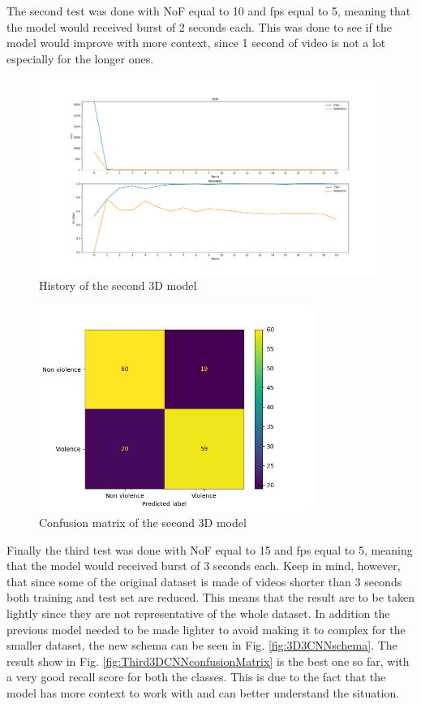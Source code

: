The second test was done with NoF equal to 10 and fps equal to 5, meaning that the model would received burst of 2 seconds each. This was done to see if the model would improve with more context, since 1 second of video is not a lot especially for the longer ones. 
\begin{figure}[]
    \centering
    \includegraphics[width=\textwidth]{images/ce07-testGiacomo3D3-9fcf-history.png}
    \caption{History of the second 3D model}
    \label{fig:Second3DCNNHistory}
\end{figure}


\begin{figure}[]
    \centering
    \includegraphics[width=0.8\textwidth]{images/ce07-testGiacomo3D3-9fcf-conf_matrix.png}
    \caption{Confusion matrix of the second 3D model}
    \label{fig:Second3DCNNconfusionMatrix}
\end{figure}


Finally the third test was done with NoF equal to 15 and fps equal to 5, meaning that the model would received burst of 3 seconds each. Keep in mind, however, that since some of the original dataset is made of videos shorter than 3 seconds both training and test set are reduced. This means that the result are to be taken lightly since they are not representative of the whole dataset. In addition the previous model needed to be made lighter to avoid making it to complex for the smaller dataset, the new schema can be seen in Fig. \ref{fig:3D3CNNschema}. The result show in Fig. \ref{fig:Third3DCNNconfusionMatrix} is the best one so far, with a very good recall score for both the classes. This is due to the fact that the model has more context to work with and can better understand the situation.


